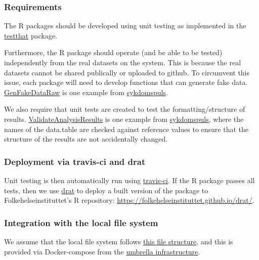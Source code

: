 \documentclass[12pt,]{article}
\begin{document}
\subsubsection{Requirements}\label{requirements}

The R packages should be developed using unit testing as implemented in
the \href{http://r-pkgs.had.co.nz/tests.html}{testthat} package.

Furthermore, the R package should operate (and be able to be tested)
independently from the real datasets on the system. This is because the
real datasets cannot be shared publically or uploaded to github. To
circumvent this issue, each package will need to develop functions that
can generate fake data.
\href{https://folkehelseinstituttet.github.io/dashboards_sykdomspuls/reference/GenFakeDataRaw.html}{GenFakeDataRaw}
is one example from
\href{https://folkehelseinstituttet.github.io/dashboards_sykdomspuls/}{sykdomspuls}.

We also require that unit tests are created to test the
formatting/structure of results.
\href{https://folkehelseinstituttet.github.io/dashboards_sykdomspuls/reference/ValidateAnalysisResults.html}{ValidateAnalysisResults}
is one example from
\href{https://folkehelseinstituttet.github.io/dashboards_sykdomspuls/}{sykdomspuls},
where the names of the data.table are checked against reference values
to ensure that the structure of the results are not accidentally
changed.

\subsubsection{Deployment via travis-ci and
drat}\label{deployment-via-travis-ci-and-drat}

Unit testing is then automatically run using
\href{http://r-pkgs.had.co.nz/check.html\#travis}{travis-ci}. If the R
package passes all tests, then we use
\href{https://github.com/eddelbuettel/drat}{drat} to deploy a built
version of the package to Folkehelseinstituttet's R repository:
\url{https://folkehelseinstituttet.github.io/drat/}.

\subsubsection{Integration with the local file
system}\label{integration-with-the-local-file-system}

We assume that the local file system follows
\protect\hyperlink{internalfilestructure}{this file structure}, and this
is provided via Docker-compose from the
\protect\hyperlink{umbrella}{umbrella infrastructure}.
\end{document}
